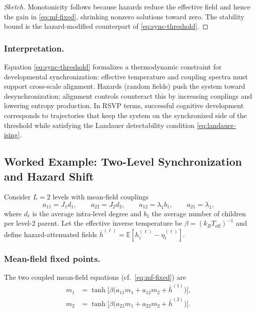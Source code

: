 \documentclass[a4paper,11pt]{article}
\begin{document}
\begin{proof}[Sketch]
Monotonicity follows because hazards reduce the effective field and hence the
gain in \eqref{eq:mf-fixed}, shrinking nonzero solutions toward zero. The
stability bound is the hazard-modified counterpart of
\eqref{eq:sync-threshold}.
\end{proof}

\subsubsection{Interpretation.}
Equation \eqref{eq:sync-threshold} formalizes a thermodynamic constraint for
developmental synchronization: effective temperature and coupling spectra must
support cross-scale alignment. Hazards (random fields) push the system toward
desynchronization; alignment controls counteract this by increasing couplings
and lowering entropy production. In RSVP terms, successful cognitive development
corresponds to trajectories that keep the system on the synchronized side of
the threshold while satisfying the Landauer detectability condition
\eqref{eq:landauer-ising}.

\subsection{Worked Example: Two-Level Synchronization and Hazard Shift}
\label{sec:L2-worked}

Consider $L{=}2$ levels with mean-field couplings
\begin{equation}
a_{11}=J_1 d_1,\qquad
a_{22}=J_2 d_2,\qquad
a_{12}=\lambda_1 b_1,\qquad
a_{21}=\lambda_1,
\end{equation}
where $d_\ell$ is the average intra-level degree and $b_1$ the average number of children per level-2 parent. Let the effective inverse temperature be $\beta{=}(k_B T_{\mathrm{eff}})^{-1}$ and define hazard-attenuated fields $\bar h^{(\ell)}=\mathbb{E}[h_i^{(\ell)}-\eta_i^{(\ell)}]$.

\subsubsection{Mean-field fixed points.}
The two coupled mean-field equations (cf.\ \eqref{eq:mf-fixed}) are
\begin{align}
m_1 &= \tanh\!\Big[\beta\big(a_{11} m_1 + a_{12} m_2 + \bar h^{(1)}\big)\Big], \label{eq:l2-m1}\\
m_2 &= \tanh\!\Big[\beta\big(a_{21} m_1 + a_{22} m_2 + \bar h^{(2)}\big)\Big]. \label{eq:l2-m2}
\end{align}
\end{document}

